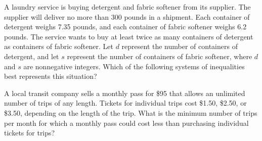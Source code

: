 \vspace{0.75em}


\newpage

\noindent\markforreview

\vspace{1em}

A laundry service is buying detergent and fabric softener from its supplier. The supplier will deliver no more than 300 pounds in a shipment. Each container of detergent weighs 7.35 pounds, and each container of fabric softener weighs 6.2 pounds. The service wants to buy at least twice as many containers of detergent as containers of fabric softener. Let \( d \) represent the number of containers of detergent, and let \( s \) represent the number of containers of fabric softener, where \( d \) and \( s \) are nonnegative integers. Which of the following systems of inequalities best represents this situation?

\vspace{0.75em}


\newpage
\noindent\markforreview

\vspace{1em}

A local transit company sells a monthly pass for \$95 that allows an unlimited number of trips of any length. Tickets for individual trips cost \$1.50, \$2.50, or \$3.50, depending on the length of the trip. What is the minimum number of trips per month for which a monthly pass could cost less than purchasing individual tickets for trips?



\vspace{5em}

\noindent\markforreview

